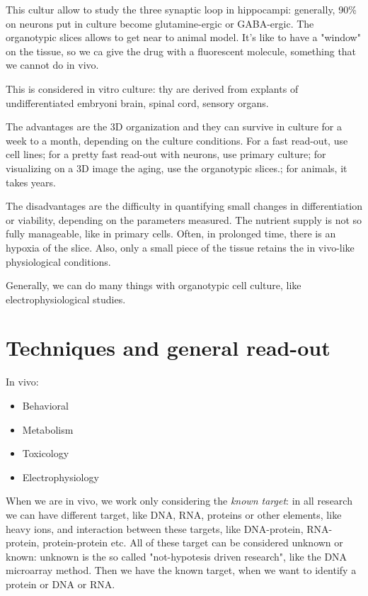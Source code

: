 \documentclass[a4paper, 12pt]{book}
\begin{document}
This cultur allow to study the three synaptic loop in hippocampi: generally, 90\% on neurons put in culture become glutamine-ergic or GABA-ergic. The organotypic slices allows to get near to animal model. It's like to have a "window" on the tissue, so we ca give the drug with a fluorescent molecule, something that we cannot do in vivo.

This is considered in vitro culture: thy are derived from explants of undifferentiated embryoni brain, spinal cord, sensory organs. 

The advantages are the 3D organization and they can survive in culture for a week to a month, depending on the culture conditions. For a fast read-out, use cell lines; for a pretty fast read-out with neurons, use primary culture; for visualizing on a 3D image the aging, use the organotypic slices.; for animals, it takes years.

The disadvantages are the difficulty in quantifying small changes in differentiation or viability, depending on the parameters measured. The nutrient supply is not so fully manageable, like in primary cells. Often, in prolonged time, there is an hypoxia of the slice. Also, only a small piece of the tissue retains the in vivo-like physiological conditions.

Generally, we can do many things with organotypic cell culture, like electrophysiological studies. 

\section{Techniques and general read-out}
In vivo:
\begin{itemize}
\item{Behavioral}
\item{Metabolism}
\item{Toxicology}
\item{Electrophysiology}
\end{itemize}

When we are in vivo, we work only considering the \emph{known target}: in all research we can have different target, like DNA, RNA, proteins or other elements, like heavy ions, and interaction between these targets, like DNA-protein, RNA-protein, protein-protein etc. All of these target can be considered unknown or known: unknown is the so called "not-hypotesis driven research", like the DNA microarray method. Then we have the known target, when we want to identify a protein or DNA or RNA.
\end{document}
